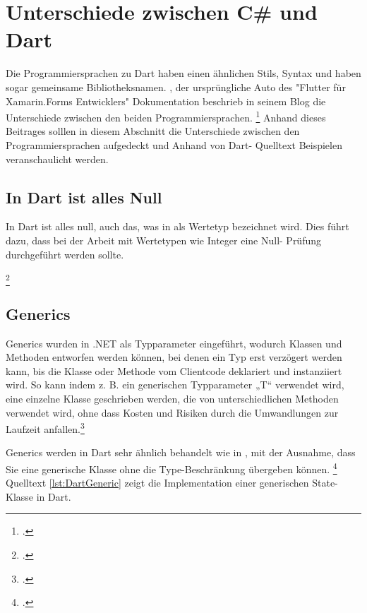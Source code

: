 \chapter{Unterschiede zwischen C\# und Dart}
\label{chap:Programmiersprachen}


Die Programmiersprachen \Csharp zu Dart haben einen ähnlichen Stils,  Syntax und haben sogar gemeinsame Bibliotheksnamen.  \citeauthor{Pedley2019}, der ursprüngliche Auto des "Flutter für Xamarin.Forms Entwicklers" Dokumentation beschrieb in seinem Blog die Unterschiede zwischen den beiden Programmiersprachen. \footcite[Vgl. ][Abgerufen am \today]{Pedley2019} Anhand dieses Beitrages solllen in diesem Abschnitt die Unterschiede zwischen den Programmiersprachen aufgedeckt und Anhand von Dart- Quelltext Beispielen veranschaulicht werden.    
\section{In Dart ist alles Null}
In Dart ist alles null, auch das, was in \Csharp als Wertetyp bezeichnet wird.  Dies führt dazu,  dass bei der Arbeit mit Wertetypen wie Integer eine Null- Prüfung durchgeführt werden sollte.

\begin{minipage}{\linewidth}

\end{minipage}
\footcitetext[In Anlehnung an ][Abgerufen am \today]{Pedley2019}


\section{Generics}
Generics wurden in .NET als Typparameter eingeführt,  wodurch Klassen und Methoden entworfen werden können, bei denen ein Typ erst verzögert werden kann,  bis die Klasse oder Methode vom Clientcode deklariert und instanziiert wird.  So kann indem z. B. ein generischen Typparameter „T“ verwendet wird,  eine einzelne Klasse geschrieben werden, die von unterschiedlichen Methoden verwendet wird, ohne dass Kosten und Risiken durch die Umwandlungen zur Laufzeit anfallen.\footcite[Vgl. ][Abgerufen am \today]{MicrosoftGenerics2015} 

Generics werden in Dart sehr ähnlich behandelt wie in \Csharp ,  mit der Ausnahme,  dass Sie eine generische Klasse ohne die Type-Beschränkung übergeben können.  \footcite[Vgl.][S. 98]{Cheng2019} Quelltext \ref{lst:DartGeneric} zeigt die Implementation einer generischen State-Klasse in Dart. 

